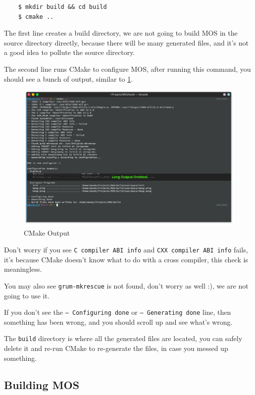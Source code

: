 \begin{verbatim}
    $ mkdir build && cd build
    $ cmake ..
\end{verbatim}

The first line creates a build directory, we are not going to build MOS in the source directory
directly, because there will be many generated files, and it's not a good idea to pollute the
source directory.

The second line runs CMake to configure MOS, after running this command, you should see a
bunch of output, similar to \ref{fig:cmake-output}.

\begin{figure}[ht]
    \centering
    \includegraphics[width=\textwidth]{assets/c1.mos-cmake-configure.png}
    \caption{CMake Output}
    \label{fig:cmake-output}
\end{figure}

Don't worry if you see \texttt{C compiler ABI info} and \texttt{CXX compiler ABI info}
fails, it's because CMake doesn't know what to do with a cross compiler, this check is meaningless.

You may also see \texttt{grum-mkrescue} is not found, don't worry as well :), we are not going to use it.

If you don't see the \texttt{-- Configuring done} or \texttt{-- Generating done} line, then
something has been wrong, and you should scroll up and see what's wrong.

The \texttt{build} directory is where all the generated files are located, you can safely
delete it and re-run CMake to re-generate the files, in case you messed up something.

\subsection{Building MOS}

